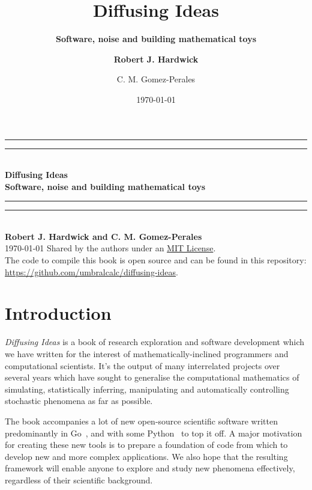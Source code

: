 \documentclass{book}
\title{\Huge \bfseries\sffamily Diffusing Ideas}
\subtitle{\Large \bfseries\sffamily \color{gray75} Software, noise and building mathematical toys}
\author{\bfseries\sffamily Robert J. Hardwick  \and C. M. Gomez-Perales}
\date{\today}
\begin{document}
\begin{titlepage}
\centering
\vspace*{1.5\baselineskip}
{\color{gray75}\rule{13cm}{1.6pt}}\vspace*{-\baselineskip}\vspace*{2pt} %
{\color{gray75}\rule{13cm}{0.4pt}} \\ %
\vspace{1.0\baselineskip} %
{\Huge \bfseries\sffamily Diffusing Ideas} \\ 
\vspace{4mm}
{\Large \bfseries\sffamily \color{gray75} Software, noise and building mathematical toys \\}
\vspace{0.75\baselineskip}
{\color{gray75} \rule{13cm}{0.4pt}}\vspace*{-\baselineskip}\vspace{3.2pt} %
{\color{gray75} \rule{13cm}{1.6pt}} %
\vspace{1.75\baselineskip} \\
{\large \bfseries\sffamily Robert J. Hardwick and C. M. Gomez-Perales \\
\vspace*{1.2\baselineskip}}
\today
\vfill
Shared by the authors under an \href{https://opensource.org/licenses/MIT}{MIT License}.\\ \vspace{1mm}
The code to compile this book is open source and can be found in this repository: \url{https://github.com/umbralcalc/diffusing-ideas}.
\end{titlepage}


\chapter*{Introduction}

\emph{Diffusing Ideas} is a book of research exploration and software development which we have written for the interest of mathematically-inclined programmers and computational scientists. It's the output of many interrelated projects over several years which have sought to generalise the computational mathematics of simulating, statistically inferring, manipulating and automatically controlling stochastic phenomena as far as possible.

The book accompanies a lot of new open-source scientific software written predominantly in Go~\cite{golang}, and with some Python~\cite{pythonlang} to top it off. A major motivation for creating these new tools is to prepare a foundation of code from which to develop new and more complex applications. We also hope that the resulting framework will enable anyone to explore and study new phenomena effectively, regardless of their scientific background.
\end{document}
